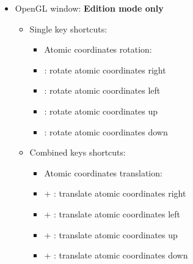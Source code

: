 {\begin{itemize}
\begin{itemize}
\begin{itemize}
\item[] \Ctrl + \DArrow : move camera down \\
\item Spinning: \\
\item[] \Ctrl + \Shift + \RArrow : spin right / increase speed r. or reduce speed left
\item[] \Ctrl + \Shift + \RArrow : spin left / increase speed left or reduce speed right
\item[] \Ctrl + \Shift + \UArrow : spin up / increase speed up or reduce speed down
\item[] \Ctrl + \Shift + \DArrow : spin down / increase speed d. or reduce speed up \\
\item[] \Ctrl +  : stop spinning \\
\end{itemize}
\end{itemize}
\item OpenGL window: {\bf{Edition mode only}}
\begin{itemize}
\item Single key shortcuts: \\
\begin{itemize}
\item Atomic coordinates rotation: \\
\item[] \RArrow : rotate atomic coordinates right
\item[] \LArrow : rotate atomic coordinates left
\item[] \UArrow : rotate atomic coordinates up
\item[] \DArrow : rotate atomic coordinates down \\
\end{itemize}
\item Combined keys shortcuts: \\
\begin{itemize}
\item Atomic coordinates translation: \\
\item[] \Ctrl + \RArrow : translate atomic coordinates right
\item[] \Ctrl + \LArrow : translate atomic coordinates left
\item[] \Ctrl + \UArrow : translate atomic coordinates up
\item[] \Ctrl + \DArrow : translate atomic coordinates down
\end{itemize}
\end{itemize}
\end{itemize}}
